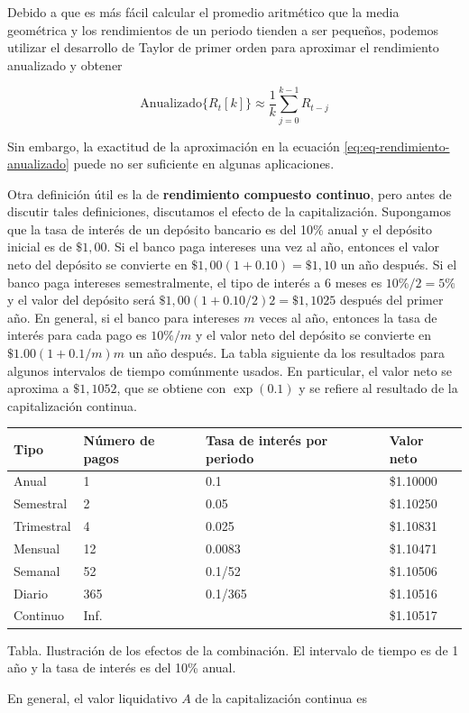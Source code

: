 \documentclass[12pt,]{krantz}
\theoremstyle{definition}
\theoremstyle{definition}
\theoremstyle{definition}
\theoremstyle{remark}
\begin{document}
Debido a que es más fácil calcular el promedio aritmético que la media
geométrica y los rendimientos de un periodo tienden a ser pequeños,
podemos utilizar el desarrollo de Taylor de primer orden para aproximar
el rendimiento anualizado y obtener

\begin{equation}
\text{Anualizado}\{R_t[k]\} \approx \frac{1}{k}\sum_{j=0}^{k-1}R_{t-j}
\label{eq:eq-rendimiento-anualizado}
\end{equation}

Sin embargo, la exactitud de la aproximación en la ecuación
\eqref{eq:eq-rendimiento-anualizado} puede no ser suficiente en algunas
aplicaciones.

Otra definición útil es la de \textbf{rendimiento compuesto continuo},
pero antes de discutir tales definiciones, discutamos el efecto de la
capitalización. Supongamos que la tasa de interés de un depósito
bancario es del 10\% anual y el depósito inicial es de \(\$1,00\). Si el
banco paga intereses una vez al año, entonces el valor neto del depósito
se convierte en \(\$1,00(1+0.10)=\$1,10\) un año después. Si el banco
paga intereses semestralmente, el tipo de interés a 6 meses es
\(10\%/2=5\%\) y el valor del depósito será
\(\$1,00(1+0.10/2)2=\$1,1025\) después del primer año. En general, si el
banco para intereses \(m\) veces al año, entonces la tasa de interés
para cada pago es \(10\%/m\) y el valor neto del depósito se convierte
en \(\$1.00(1+0.1/m)m\) un año después. La tabla siguiente da los
resultados para algunos intervalos de tiempo comúnmente usados. En
particular, el valor neto se aproxima a \(\$1,1052\), que se obtiene con
\(\exp(0.1)\) y se refiere al resultado de la capitalización continua.

\begin{longtable}[]{@{}llll@{}}
\toprule
Tipo & Número de pagos & Tasa de interés por periodo & Valor
neto\tabularnewline
\midrule
\endhead
Anual & 1 & 0.1 & \$1.10000\tabularnewline
Semestral & 2 & 0.05 & \$1.10250\tabularnewline
Trimestral & 4 & 0.025 & \$1.10831\tabularnewline
Mensual & 12 & 0.0083 & \$1.10471\tabularnewline
Semanal & 52 & 0.1/52 & \$1.10506\tabularnewline
Diario & 365 & 0.1/365 & \$1.10516\tabularnewline
Continuo & Inf. & & \$1.10517\tabularnewline
\bottomrule
\end{longtable}

Tabla. Ilustración de los efectos de la combinación. El intervalo de
tiempo es de 1 año y la tasa de interés es del 10\% anual.

En general, el valor liquidativo \(A\) de la capitalización continua es
\end{document}
